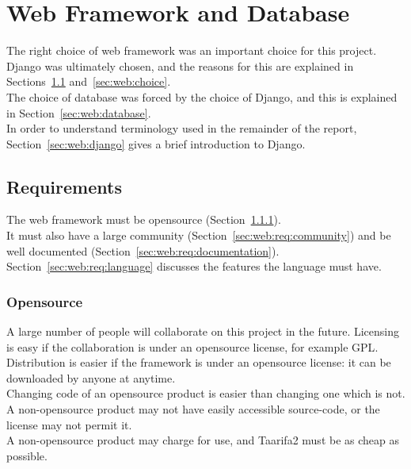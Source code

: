 \chapter{Web Framework and Database}
The right choice of web framework was an important choice for this project. Django was ultimately chosen, and the reasons for this are explained in Sections~\ref{sec:web:req} and~\ref{sec:web:choice}. \\

The choice of database was forced by the choice of Django, and this is explained in Section~\ref{sec:web:database}. \\

In order to understand terminology used in the remainder of the report, Section~\ref{sec:web:django} gives a brief introduction to Django.

\section{Requirements}
\label{sec:web:req}

The web framework must be opensource (Section~\ref{sec:web:req:opensource}). \\
It must also have a large community (Section~\ref{sec:web:req:community}) and be well documented (Section~\ref{sec:web:req:documentation}). \\
Section~\ref{sec:web:req:language} discusses the features the language must have.

\subsection{Opensource}
\label{sec:web:req:opensource}

A large number of people will collaborate on this project in the future. Licensing is easy if the collaboration is under an opensource license, for example \gls{GPL}. \\

Distribution is easier if the framework is under an opensource license: it can be downloaded by anyone at anytime. \\

Changing code of an opensource product is easier than changing one which is not. A non-opensource product may not have easily accessible source-code, or the license may not permit it. \\

A non-opensource product may charge for use, and Taarifa2 must be as cheap as possible.

